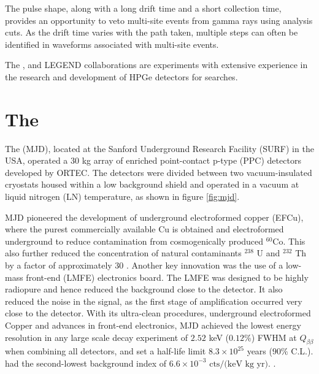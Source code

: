 The pulse shape, along with a long drift time and a short collection time, provides an opportunity to veto multi-site events from gamma rays using analysis cuts. As the drift time varies with the path taken, multiple steps can often be identified in waveforms associated with multi-site events.

The {\MJ}, {\Gerda} and LEGEND collaborations are experiments with extensive experience in the research and development of HPGe detectors for {\onbb} searches.


\section{The {\MJD}}
The {\MJD} (MJD), located at the Sanford Underground Research Facility (SURF) in the USA, operated a $30$ kg array of enriched point-contact p-type (PPC) detectors developed by ORTEC. The detectors were divided between two vacuum-insulated cryostats housed within a low background shield and operated in a vacuum at liquid nitrogen (LN) temperature, as shown in figure \ref{fig:mjd}. 

MJD pioneered the development of underground electroformed copper (EFCu), where the purest commercially available Cu is obtained and electroformed underground to reduce contamination from cosmogenically produced $^{60}$Co. This also further reduced the concentration of natural contaminants $^{238}$ U and $^{232}$ Th by a factor of approximately 30 \cite{Abgrall:2016cct}. Another key innovation was the use of a low-mass front-end (LMFE) electronics board. The LMFE was designed to be highly radiopure and hence reduced the background close to the detector. It also reduced the noise in the signal, as the first stage of amplification occurred very close to the detector. With its ultra-clean procedures, underground electroformed Copper and advances in front-end electronics, MJD achieved the lowest energy resolution in any large scale {\onbb} decay experiment of $2.52$ keV ($0.12\%$) FWHM at $Q_{\beta\beta}$ when combining all detectors, and set a half-life limit $8.3 \times 10^{25}$ years ($90\%$ C.L.). {\MJD} had the second-lowest background index of $6.6 \times 10^{-3} \text{ cts/(keV kg yr)}$. \cite{Majorana_final}.

